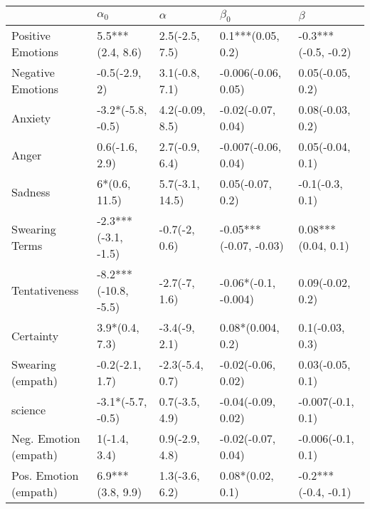 \begin{tabular}{lllll}
\toprule
{} &            $\alpha_0$ &         $\alpha$ &               $\beta_0$ &              $\beta$ \\
\midrule
Positive Emotions     &      5.5***(2.4, 8.6) &   2.5(-2.5, 7.5) &       0.1***(0.05, 0.2) &  -0.3***(-0.5, -0.2) \\
Negative Emotions     &         -0.5(-2.9, 2) &   3.1(-0.8, 7.1) &     -0.006(-0.06, 0.05) &     0.05(-0.05, 0.2) \\
Anxiety               &     -3.2*(-5.8, -0.5) &  4.2(-0.09, 8.5) &      -0.02(-0.07, 0.04) &     0.08(-0.03, 0.2) \\
Anger                 &        0.6(-1.6, 2.9) &   2.7(-0.9, 6.4) &     -0.007(-0.06, 0.04) &     0.05(-0.04, 0.1) \\
Sadness               &         6*(0.6, 11.5) &  5.7(-3.1, 14.5) &        0.05(-0.07, 0.2) &      -0.1(-0.3, 0.1) \\
Swearing Terms        &   -2.3***(-3.1, -1.5) &    -0.7(-2, 0.6) &  -0.05***(-0.07, -0.03) &   0.08***(0.04, 0.1) \\
Tentativeness         &  -8.2***(-10.8, -5.5) &    -2.7(-7, 1.6) &    -0.06*(-0.1, -0.004) &     0.09(-0.02, 0.2) \\
Certainty             &        3.9*(0.4, 7.3) &    -3.4(-9, 2.1) &       0.08*(0.004, 0.2) &      0.1(-0.03, 0.3) \\
Swearing (empath)     &       -0.2(-2.1, 1.7) &  -2.3(-5.4, 0.7) &      -0.02(-0.06, 0.02) &     0.03(-0.05, 0.1) \\
science               &     -3.1*(-5.7, -0.5) &   0.7(-3.5, 4.9) &      -0.04(-0.09, 0.02) &    -0.007(-0.1, 0.1) \\
Neg. Emotion (empath) &          1(-1.4, 3.4) &   0.9(-2.9, 4.8) &      -0.02(-0.07, 0.04) &    -0.006(-0.1, 0.1) \\
Pos. Emotion (empath) &      6.9***(3.8, 9.9) &   1.3(-3.6, 6.2) &        0.08*(0.02, 0.1) &  -0.2***(-0.4, -0.1) \\
\bottomrule
\end{tabular}
